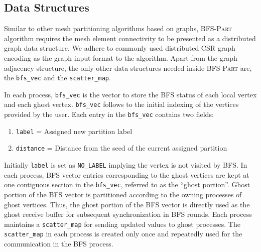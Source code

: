 \documentclass[conference]{IEEEtran}
\newcommand{\bfspart}{\textsc{BFS-Part}\xspace}
\begin{document}
\subsection{Data Structures}
Similar to other mesh partitioning algorithms based on graphs, \bfspart algorithm requires the mesh element connectivity to be presented as a distributed graph data structure. We adhere to commonly used distributed CSR graph encoding as the graph input format to the algorithm. Apart from the graph adjacency structure, the only other data structures needed inside \bfspart are, the \verb|bfs_vec| and the \verb|scatter_map|.
\par
In each process, \verb|bfs_vec| is the vector to store the BFS status of each local vertex and each ghost vertex. \verb|bfs_vec| follows to the initial indexing of the vertices provided by the user. Each entry in the \verb|bfs_vec| contains two fields: 
\begin{enumerate}
    \item \verb|label| = Assigned new partition label
    \item \verb|distance| = Distance from the seed of the current assigned partition
\end{enumerate}
\par
Initially \verb|label| is set as \verb|NO_LABEL| implying the vertex is not visited by BFS. In each process, BFS vector entries corresponding to the ghost vertices are kept at one contiguous section in the \verb|bfs_vec|, referred to as the ``ghost portion''. Ghost portion of the BFS vector is partitioned according to the owning processes of ghost vertices. Thus, the ghost portion of the BFS vector is directly used as the ghost receive buffer for subsequent synchronization in BFS rounds. Each process maintains a \verb|scatter_map| for sending updated values to ghost processes. The \verb|scatter_map| in each process is created only once and repeatedly used for the communication in the BFS process.

\end{document}
